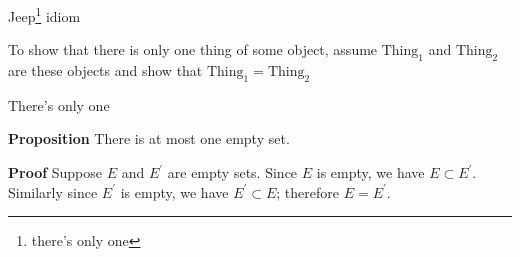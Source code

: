 \documentclass[professionalfonts]{beamer}%
\begin{document}
\begin{frame}[fragile]{Jeep\footnote{there's only one} idiom}{}%

To show that there is only one thing of some object, assume \(\mbox{Thing}_1\) and \(\mbox{Thing}_2\) are these objects and show that  \(\mbox{Thing}_1 = \mbox{Thing}_2\)


\begin{block}{There's only one}

\textbf{Proposition} There is at most one empty set.

\vspace{0.1in}
\textbf{Proof} Suppose \(E\) and \(E^\prime\) are empty sets. Since \(E\) is empty, we have \(E \subset E^\prime\). Similarly since \(E^\prime\) is empty,
we have \(E^\prime \subset E\); therefore \(E = E^\prime\).

\end{block}

\end{frame}
\end{document}
